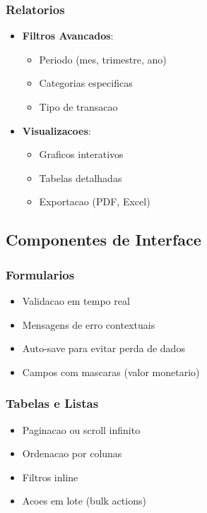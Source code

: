 \subsubsection{Relatorios}
\begin{itemize}
    \item \textbf{Filtros Avancados}:
    \begin{itemize}
        \item Periodo (mes, trimestre, ano)
        \item Categorias especificas
        \item Tipo de transacao
    \end{itemize}
    \item \textbf{Visualizacoes}:
    \begin{itemize}
        \item Graficos interativos
        \item Tabelas detalhadas
        \item Exportacao (PDF, Excel)
    \end{itemize}
\end{itemize}

\subsection{Componentes de Interface}

\subsubsection{Formularios}
\begin{itemize}
    \item Validacao em tempo real
    \item Mensagens de erro contextuais
    \item Auto-save para evitar perda de dados
    \item Campos com mascaras (valor monetario)
\end{itemize}

\subsubsection{Tabelas e Listas}
\begin{itemize}
    \item Paginacao ou scroll infinito
    \item Ordenacao por colunas
    \item Filtros inline
    \item Acoes em lote (bulk actions)
\end{itemize}

